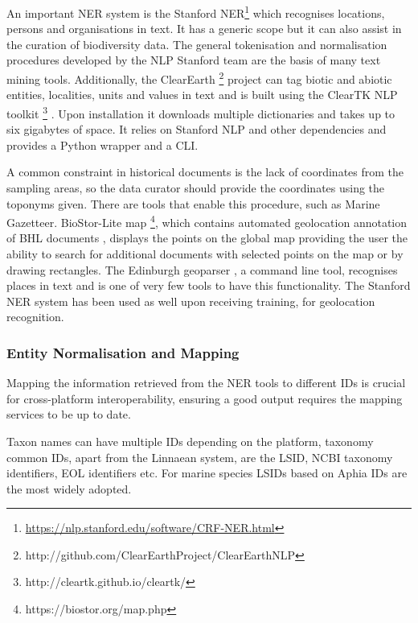 An important NER system is the Stanford NER\footnote{\url{https://nlp.stanford.edu/software/CRF-NER.html}}
\parencite{finkel_incorporating_2005} which recognises locations, persons and
organisations in text. It has a generic scope but it can also assist in the
curation of biodiversity data. The general tokenisation and normalisation
procedures developed by the NLP Stanford team are the basis of many text mining
tools. Additionally, the ClearEarth \footnote{http://github.com/ClearEarthProject/ClearEarthNLP}
project \parencite{thessen_automated_2018} can tag biotic and abiotic entities,
localities, units and values in text and is built using the ClearTK NLP
toolkit \footnote{http://cleartk.github.io/cleartk/} \parencite{bethard_cleartk_2014}.
Upon installation it downloads multiple dictionaries and takes up to six
gigabytes of space. It relies on Stanford NLP and other dependencies and
provides a Python wrapper and a CLI.

A common constraint in historical documents is the lack of coordinates from the
sampling areas, so the data curator should provide the coordinates using the
toponyms given. There are tools that enable this procedure, such as Marine
Gazetteer. BioStor-Lite map \footnote{https://biostor.org/map.php}, which
contains automated geolocation annotation of BHL documents
\parencite{page_text-mining_2019}, displays the points on the global map providing
the user the ability to search for additional documents with selected points on
the map or by drawing rectangles. The Edinburgh geoparser
\parencite{alex_adapting_2015}, a command line tool, recognises places in text and
is one of very few tools to have this functionality. The Stanford NER system
has been used as well \parencite{stahlman_geoparsing_2019} upon receiving training,
for geolocation recognition.

   \subsubsection{Entity Normalisation and Mapping}
   Mapping the information retrieved from the NER tools to different IDs is
crucial for cross-platform interoperability, ensuring a good output requires
the mapping services to be up to date.

Taxon names can have multiple IDs depending on the platform, taxonomy common
IDs, apart from the Linnaean system, are the LSID, NCBI taxonomy identifiers,
EOL identifiers etc. For marine species LSIDs based on Aphia IDs are the most
widely adopted.


